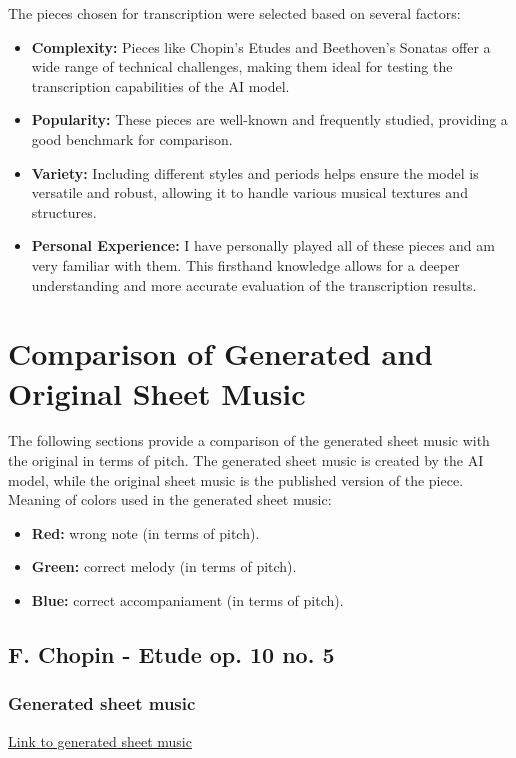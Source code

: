 \documentclass{article}
\begin{document}
The pieces chosen for transcription were selected based on several factors:
\begin{itemize}
    \item \textbf{Complexity:} Pieces like Chopin's Etudes and Beethoven's Sonatas offer a wide range of technical challenges, making them ideal for testing the transcription capabilities of the AI model.
    \item \textbf{Popularity:} These pieces are well-known and frequently studied, providing a good benchmark for comparison.
    \item \textbf{Variety:} Including different styles and periods helps ensure the model is versatile and robust, allowing it to handle various musical textures and structures.
    \item \textbf{Personal Experience:} I have personally played all of these pieces and am very familiar with them. This firsthand knowledge allows for a deeper understanding and more accurate evaluation of the transcription results.
\end{itemize}



\section{Comparison of Generated and Original Sheet Music}

The following sections provide a comparison of the generated sheet music with the original in terms of pitch. The generated sheet music is created by the AI model, while the original sheet music is the published version of the piece. Meaning of colors used in the generated sheet music:
\begin{itemize}
    \item \textbf{Red:} wrong note (in terms of pitch).
    \item \textbf{Green:} correct melody (in terms of pitch).
    \item \textbf{Blue:} correct accompaniament (in terms of pitch).
\end{itemize}

\subsection{F. Chopin - Etude op. 10 no. 5}

\subsubsection{Generated sheet music}
\hyperref[fig:generated_chopin]{Link to generated sheet music}
\end{document}
